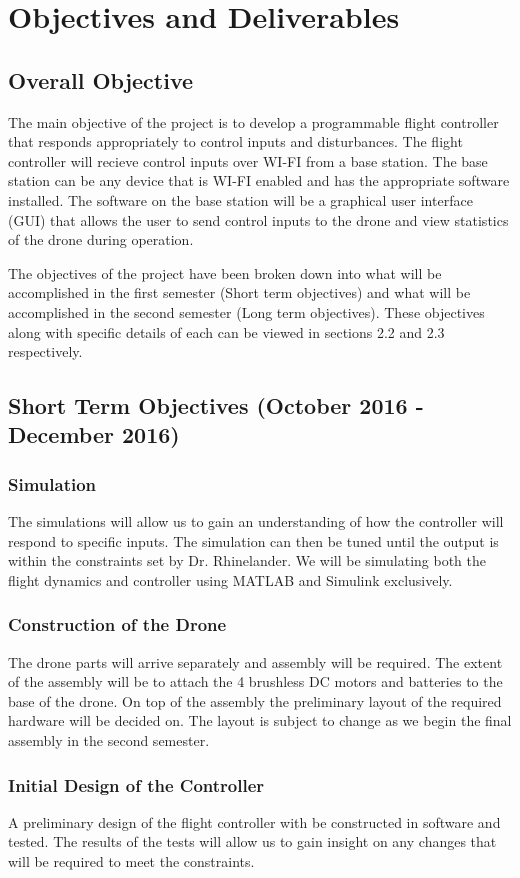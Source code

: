 \section{Objectives and Deliverables}
\subsection{Overall Objective}
The main objective of the project is to develop a programmable flight controller that responds appropriately to control inputs and disturbances. The flight controller will recieve control inputs over WI-FI from a base station. The base station can be any device that is WI-FI enabled and has the appropriate software installed. The software on the base station will be a graphical user interface (GUI) that allows the user to send control inputs to the drone and view statistics of the drone during operation. 

The objectives of the project have been broken down into what will be accomplished in the first semester (Short term objectives) and what will be accomplished in the second semester (Long term objectives). These objectives along with specific details of each can be viewed in sections 2.2 and 2.3 respectively.  

\subsection{Short Term Objectives (October 2016 - December 2016)}
\subsubsection{Simulation}

The simulations will allow us to gain an understanding of how the controller will respond to specific inputs. The simulation can then be tuned until the output is within the constraints set by Dr. Rhinelander. We will be simulating both the flight dynamics and controller using MATLAB and Simulink exclusively.

\subsubsection{Construction of the Drone}

The drone parts will arrive separately and assembly will be required. The extent of the assembly will be to attach the 4 brushless DC motors and batteries to the base of the drone. On top of the assembly the preliminary layout of the required hardware will be decided on. The layout is subject to change as we begin the final assembly in the second semester. 

\subsubsection{Initial Design of the Controller} 
A preliminary design of the flight controller with be constructed in software and tested. The results of the tests will allow us to gain insight on any changes that will be required to meet the constraints. 


	
